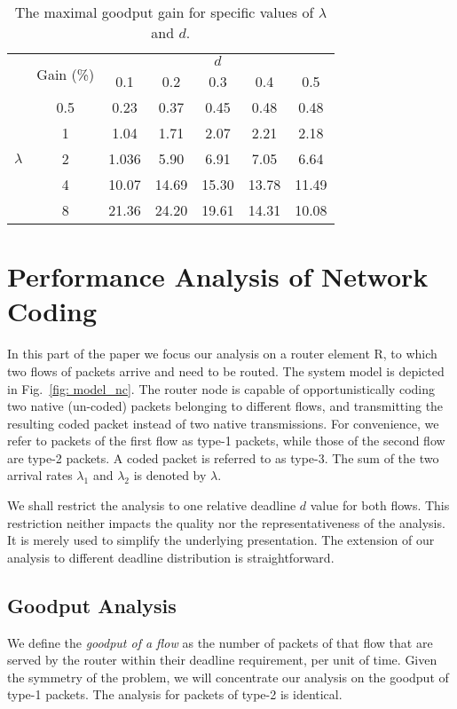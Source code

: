 \documentclass[preprint,12pt]{elsarticle}
\theoremstyle{definition}
\theoremstyle{plain}
\theoremstyle{remark}
\begin{document}
\begin{table}[t]
\centering
\begin{tabular}{|cc|ccccc|}
\hline
&\multirow{2}{*}{Gain (\%)}& \multicolumn{5}{c|}{$d$}\\
  && 0.1 & 0.2 & 0.3 & 0.4 & 0.5 \\
  \hline
  \multirow{5}{*}{$\lambda$}
 &0.5 & 0.23 & 0.37 & 0.45 & 0.48 & 0.48 \\
 & 1 & 1.04 & 1.71 & 2.07 & 2.21 & 2.18 \\
 & 2  & 1.036 & 5.90 & 6.91 & 7.05 & 6.64 \\
 & 4 & 10.07 & 14.69 & 15.30 & 13.78 & 11.49 \\
 & 8 & 21.36 & 24.20 & 19.61 & 14.31 & 10.08 \\
 \hline
\end{tabular}
\caption{The maximal goodput gain for specific values of $\lambda$ and $d$.}
\label{tab: maximal gain values}
\end{table}

\section{Performance Analysis of Network Coding} \label{section:performanceAnalysisNetworkCoding}
In this part of the paper we focus our analysis on a router element R, to which two flows of packets arrive and need to be routed. The system model is depicted in Fig.~\ref{fig: model_nc}. The router node is capable of opportunistically coding two native (un-coded) packets belonging to different flows, and transmitting the resulting coded packet instead of two native transmissions. For convenience, we refer to packets of the first flow as type-1 packets, while those of the second flow are type-2 packets. A coded packet is referred to as type-3. The sum of the two arrival rates $\lambda_{1}$ and $\lambda_{2}$ is denoted by $\lambda$.

We shall restrict the analysis to one relative deadline $d$ value for both flows. This restriction neither impacts the quality nor the representativeness of the analysis. It is merely used to simplify the underlying presentation. The extension of our analysis to different deadline distribution is straightforward.

\subsection{Goodput Analysis}
We define the \textit{goodput of a flow} as the number of packets of that flow that are served by the router within their deadline requirement, per unit of time. Given the symmetry of the problem, we will concentrate our analysis on the goodput of type-1 packets. The analysis for packets of type-2 is identical.
\end{document}
